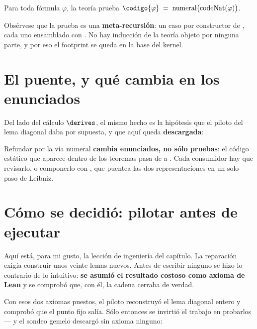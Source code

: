 
\begin{teorema}
\label{teo:formcode-numeral}
Para toda fórmula $\varphi$, la teoría prueba
$\codigo{\varphi} \;=\; \mathrm{numeral}\bigl(\mathrm{codeNat}(\varphi)\bigr)$.
\end{teorema}


Obsérvese que la prueba es una \textbf{meta-recursión}: un caso por constructor de ,
cada uno ensamblado con . No hay inducción de la teoría objeto por ninguna
parte, y por eso el footprint se queda en la base del kernel.

\section{El puente, y qué cambia en los enunciados}

Del lado del cálculo $\derives$, el mismo hecho es la hipótesis que el piloto del lema diagonal
daba por supuesta, y que aquí queda \textbf{descargada}:


\begin{muro}
Refundar por la vía numeral \textbf{cambia enunciados, no sólo pruebas}: el código estático que
aparece dentro de los teoremas pasa de  a
. Cada consumidor hay que revisarlo, o componerlo con
, que puentea las dos representaciones en un solo paso de Leibniz.
\end{muro}

\section{Cómo se decidió: pilotar antes de ejecutar}

Aquí está, para mi gusto, la lección de ingeniería del capítulo. La reparación exigía construir
unos veinte lemas nuevos. Antes de escribir ninguno se hizo lo contrario de lo intuitivo:
\textbf{se asumió el resultado costoso como axioma de Lean} y se comprobó que, con él, la cadena
cerraba de verdad.


Con esos dos axiomas puestos, el piloto reconstruyó el lema diagonal entero y comprobó que el punto
fijo salía. Sólo entonces se invirtió el trabajo en probarlos — y el sondeo gemelo descargó 
sin axioma ninguno:

